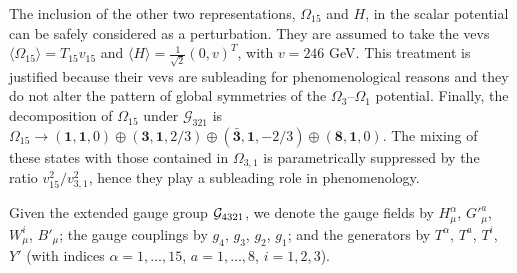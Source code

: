 The inclusion of the other two representations, $\Omega_{15}$ and $H$, in the scalar potential can be safely considered as a perturbation. They are assumed to take the vevs $\langle \Omega_{15} \rangle = T_{15} v_{15}$ and $\langle H \rangle = \tfrac{1}{\sqrt{2}} (0, v)^T$, with $v = 246$ GeV. This treatment is justified because their vevs are subleading for phenomenological reasons and they do not alter the pattern of global symmetries of the $\Omega_3$--$\Omega_1$ potential.
Finally, the decomposition of $\Omega_{15}$ under $\mathcal{G}_{321}$ is $\Omega_{15} \to (\mathbf{1},\mathbf{1},0) \oplus (\mathbf{3},\mathbf{1},2/3) \oplus (\mathbf{\bar 3},\mathbf{1},-2/3) \oplus (\mathbf{8}, \mathbf{1}, 0)$. The mixing of these states with those contained in $\Omega_{3,1}$ is parametrically suppressed by the ratio $v^2_{15} / v^2_{3,1}$, hence they play a subleading role in phenomenology.

Given the extended gauge group $\mathcal{G}_{\rm 4321}$,
we denote the gauge fields by $H^\alpha_\mu$, $G'^a_\mu$, $W^i_\mu$, $B'_\mu$; the gauge couplings by $g_4$, $g_3$, $g_2$, $g_1$; and the generators by $T^\alpha$, $T^a$, $T^i$, $Y'$
(with indices $\alpha = 1, \dots, 15$, $a = 1, \dots, 8$, $i=1,2,3$). 

